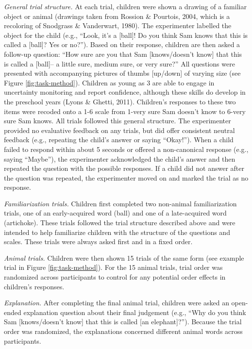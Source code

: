 \documentclass[10pt, letterpaper]{article}
\begin{document}
\emph{General trial structure.} At each trial, children were shown a
drawing of a familiar object or animal (drawings taken from Rossion \&
Pourtois, 2004, which is a recoloring of Snodgrass \& Vanderwart, 1980).
The experimenter labelled the object for the child (e.g., ``Look, it's a
{[}ball{]}! Do you think Sam knows that this is called a {[}ball{]}? Yes
or no?''). Based on their response, children are then asked a follow-up
question: ``How sure are you that Sam {[}knows/doesn't know{]} that this
is called a {[}ball{]}-- a little sure, medium sure, or very sure?'' All
questions were presented with accompanying pictures of thumbs
{[}up/down{]} of varying size (see Figure \ref{fig:task-method}).
Children as young as 3 are able to engage in uncertainty monitoring and
report confidence, although these skills do develop in the preschool
years (Lyons \& Ghetti, 2011). Children's responses to these two items
were recoded onto a 1-6 scale from 1-very sure Sam doesn't know to
6-very sure Sam knows. All trials followed this general structure. The
experimenter provided no evaluative feedback on any trials, but did
offer consistent neutral feedback (e.g., repeating the child's answer or
saying ``Okay!''). When a child failed to respond within about 5 seconds
or offered a non-canonical response (e.g., saying ``Maybe''), the
experimenter acknowledged the child's answer and then repeated the
question with the possible responses. If a child did not answer after
the question was repeated, the experimenter moved on and marked the
trial as no response.

\emph{Familiarization trials.} Children first completed two non-animal
familiarization trials, one of an early-acquired word (ball) and one of
a late-acquired word (artichoke). These trials followed the trial
structure described above and were intended to help familiarize children
with the structure of the questions and scales. These trials were always
asked first and in a fixed order.

\emph{Animal trials.} Children were then shown 15 trials of the same
form (see example trial in Figure \ref{fig:task-method}). For the 15
animal trials, trial order was randomized across participants to control
for any potential order effects in children's responses.

\emph{Explanation.} After completing the final animal trial, children
were asked an open-ended explanation question about their final
judgement (e.g., ``Why do you think Sam {[}knows/doesn't know{]} that
this is called {[}an elephant{]}?''). Because the trial order was
randomized, the explanations concerned different animal words across
participants.
\end{document}
